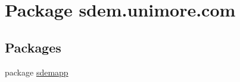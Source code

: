\hypertarget{namespacesdem_1_1unimore_1_1com}{\section{Package sdem.\+unimore.\+com}
\label{namespacesdem_1_1unimore_1_1com}
}
\subsection*{Packages}
\begin{DoxyCompactItemize}
\item 
package \hyperlink{namespacesdem_1_1unimore_1_1com_1_1sdemapp}{sdemapp}
\end{DoxyCompactItemize}
